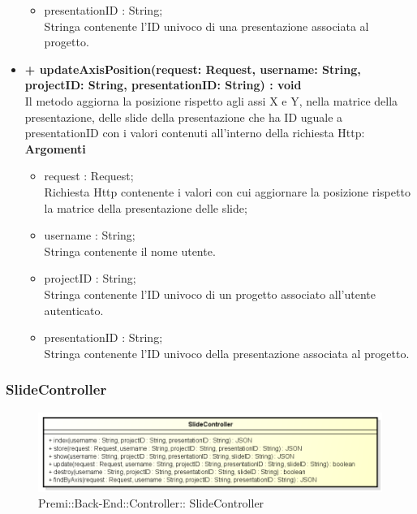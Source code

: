 \begin{itemize}
\begin{itemize}
				\item presentationID : String; \\
				Stringa contenente l'ID univoco di una presentazione associata al progetto.
			\end{itemize}
			\item \textbf{+ updateAxisPosition(request: Request, username: String, projectID: String, presentationID: String) : void}\\
			Il metodo aggiorna la posizione rispetto agli assi X e Y, nella matrice della presentazione, delle \gls{slide} della presentazione che ha ID uguale a presentationID con i valori contenuti all'interno della richiesta Http:\\
			\textbf{Argomenti}
			\begin{itemize}
				\item request : Request;\\
				Richiesta Http contenente i valori con cui aggiornare la posizione rispetto la matrice della presentazione delle \gls{slide};
				\item username : String; \\
				Stringa contenente il nome utente.
				\item projectID : String; \\
				Stringa contenente l'ID univoco di un progetto associato all'utente autenticato.
				\item presentationID : String; \\
				Stringa contenente l'ID univoco della presentazione associata al progetto.
			\end{itemize}
		\end{itemize}
		
\newpage
\subsubsection{SlideController}
\begin{figure}[h]
\centering
\includegraphics[width=0.8\linewidth]{img/back_end_http_controllers_slideController}
\caption[Premi::Back-End::Controller::SlideController]{Premi::Back-End::Controller:: SlideController}
\label{fig:back_end_http_controllers_slideController}
\end{figure}

